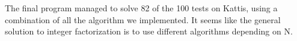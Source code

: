 The final program managed to solve 82 of the 100 tests on Kattis, using a combination of all the algorithm we implemented. It seems like the general solution to integer factorization is to use different algorithms depending on N. 